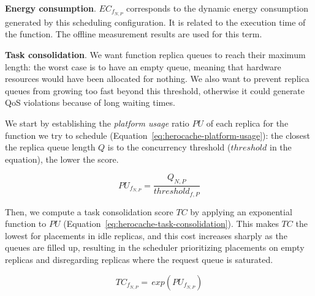 \textbf{Energy consumption}. ${EC}_{{f}_{N, P}}$ corresponds to the dynamic energy consumption generated by this scheduling configuration. It is related to the execution time of the function. The offline measurement results are used for this term.


\textbf{Task consolidation}. We want function replica queues to reach their maximum length: the worst case is to have an empty queue, meaning that hardware resources would have been allocated for nothing. We also want to prevent replica queues from growing too fast beyond this threshold, otherwise it could generate QoS violations because of long waiting times.

We start by establishing the \textit{platform usage} ratio $PU$ of each replica for the function we try to schedule (Equation~\ref{eq:herocache-platform-usage}): the closest the replica queue length $Q$ is to the concurrency threshold ($threshold$ in the equation), the lower the score. 

\begin{equation}
    PU_{f_{N, P}} = \frac{Q_{N, P}}{threshold_{f, P}}
\label{eq:herocache-platform-usage}
\end{equation}

Then, we compute a task consolidation score $TC$ by applying an exponential function to $PU$ (Equation~\ref{eq:herocache-task-consolidation}). This makes $TC$ the lowest for placements in idle replicas, and this cost increases sharply as the queues are filled up, resulting in the scheduler prioritizing placements on empty replicas and disregarding replicas where the request queue is saturated.

\begin{equation}
    TC_{{f}_{N, P}} = \, exp(PU_{f_{N, P}})
\label{eq:herocache-task-consolidation}
\end{equation}


